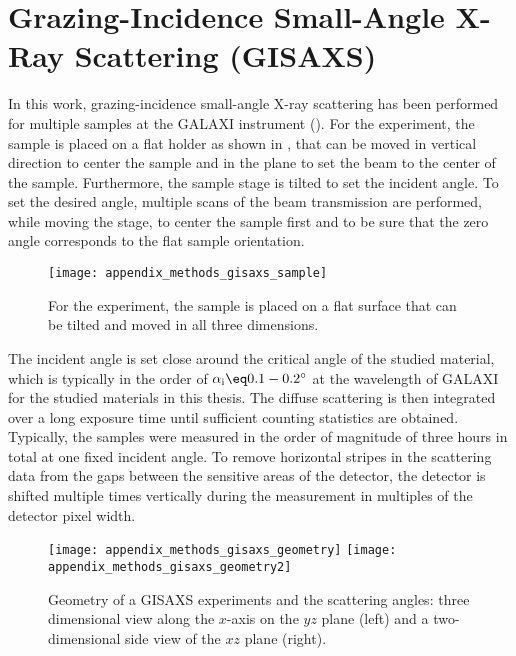 \documentclass[\main/dresen_thesis.tex]{subfiles}
\begin{document}
  \section{Grazing-Incidence Small-Angle X-Ray Scattering (GISAXS)}
    \label{ch:methods:gisaxs}
    In this work, grazing-incidence small-angle X-ray scattering has been performed for multiple samples at the GALAXI instrument ().
    For the experiment, the sample is placed on a flat holder as shown in , that can be moved in vertical direction to center the sample and in the plane to set the beam to the center of the sample.
    Furthermore, the sample stage is tilted to set the incident angle.
    To set the desired angle, multiple scans of the beam transmission are performed, while moving the stage, to center the sample first and to be sure that the zero angle corresponds to the flat sample orientation.
    \begin{figure}[tb]
      \centering
      \texttt{[image: appendix\_methods\_gisaxs\_sample]}
      \caption{\label{fig:methods:gisaxs:samples}For the experiment, the sample is placed on a flat surface that can be tilted and moved in all three dimensions.}
    \end{figure}

    The incident angle is set close around the critical angle of the studied material, which is typically in the order of $\alpha_\mathrm{i} \eq 0.1 - 0.2 ^\circ$ at the wavelength of GALAXI for the studied materials in this thesis.
    The diffuse scattering is then integrated over a long exposure time until sufficient counting statistics are obtained.
    Typically, the samples were measured in the order of magnitude of three hours in total at one fixed incident angle.
    To remove horizontal stripes in the scattering data from the gaps between the sensitive areas of the detector, the detector is shifted multiple times vertically during the measurement in multiples of the detector pixel width.

    \begin{figure}[tb]
      \centering
      \texttt{[image: appendix\_methods\_gisaxs\_geometry]}
      \texttt{[image: appendix\_methods\_gisaxs\_geometry2]}
      \caption{\label{fig:methods:gisaxs:geometry}Geometry of a GISAXS experiments and the scattering angles: three dimensional view along the $x$-axis on the $yz$ plane (left) and a two-dimensional side view of the $xz$ plane (right).}
    \end{figure}
\end{document}
